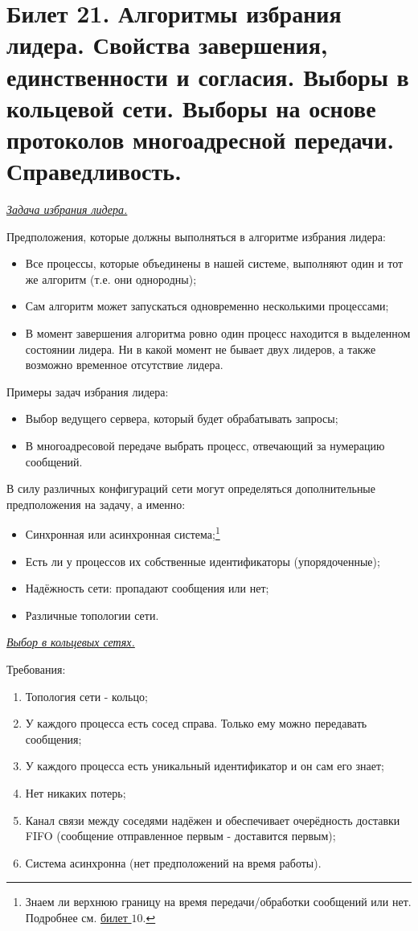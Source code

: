 \newpage
\section{Билет 21. Алгоритмы избрания лидера. Свойства завершения, единственности и согласия. Выборы в кольцевой сети. Выборы на основе протоколов многоадресной передачи. Справедливость.}\label{b21}
\begin{center}
    \textit{\underline{Задача избрания лидера.}}
\end{center}
Предположения, которые должны выполняться в алгоритме избрания лидера:
\begin{itemize}
\item Все процессы, которые объединены в нашей системе, выполняют один и тот же алгоритм (т.е. они однородны);
\item Сам алгоритм может запускаться одновременно несколькими процессами;
\item В момент завершения алгоритма ровно один процесс находится в выделенном состоянии лидера. Ни в какой момент не бывает двух лидеров, а также возможно временное отсутствие лидера.
\end{itemize}
Примеры задач избрания лидера: 
\begin{itemize}
\item Выбор ведущего сервера, который будет обрабатывать запросы;
\item В многоадресовой передаче выбрать процесс, отвечающий за нумерацию сообщений.
\end{itemize}
В силу различных конфигураций сети могут определяться дополнительные предположения на задачу, а именно:
\begin{itemize}
\item Синхронная или асинхронная система;\footnote{Знаем ли верхнюю границу на время передачи/обработки сообщений или нет. Подробнее см. \hyperlink{b_10_sending}{билет $10$}.}
\item Есть ли у процессов их собственные идентификаторы (упорядоченные);
\item Надёжность сети: пропадают сообщения или нет;
\item Различные топологии сети.
\end{itemize}
\begin{center}
    \textit{\underline{Выбор в кольцевых сетях.}}
\end{center}
Требования:
\begin{enumerate}
\item Топология сети - кольцо;
\item У каждого процесса есть сосед справа. Только ему можно передавать сообщения;
\item У каждого процесса есть уникальный идентификатор и он сам его знает;
\item Нет никаких потерь;
\item Канал связи между соседями надёжен и обеспечивает очерёдность доставки FIFO (сообщение отправленное первым - доставится первым);
\item Система асинхронна (нет предположений на время работы).
\end{enumerate}


